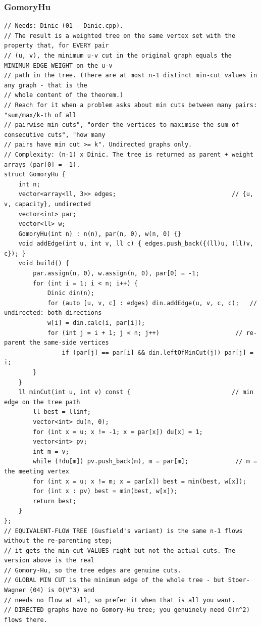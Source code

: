 \documentclass[9pt,a4paper,twocolumn]{extarticle}
\begin{document}
\subsubsection{GomoryHu}
\nopagebreak
\begin{lstlisting}
// Needs: Dinic (01 - Dinic.cpp).
// The result is a weighted tree on the same vertex set with the property that, for EVERY pair
// (u, v), the minimum u-v cut in the original graph equals the MINIMUM EDGE WEIGHT on the u-v
// path in the tree. (There are at most n-1 distinct min-cut values in any graph - that is the
// whole content of the theorem.)
// Reach for it when a problem asks about min cuts between many pairs: "sum/max/k-th of all
// pairwise min cuts", "order the vertices to maximise the sum of consecutive cuts", "how many
// pairs have min cut >= k". Undirected graphs only.
// Complexity: (n-1) x Dinic. The tree is returned as parent + weight arrays (par[0] = -1).
struct GomoryHu {
    int n;
    vector<array<ll, 3>> edges;                                // {u, v, capacity}, undirected
    vector<int> par;
    vector<ll> w;
    GomoryHu(int n) : n(n), par(n, 0), w(n, 0) {}
    void addEdge(int u, int v, ll c) { edges.push_back({(ll)u, (ll)v, c}); }
    void build() {
        par.assign(n, 0), w.assign(n, 0), par[0] = -1;
        for (int i = 1; i < n; i++) {
            Dinic din(n);
            for (auto [u, v, c] : edges) din.addEdge(u, v, c, c);   // undirected: both directions
            w[i] = din.calc(i, par[i]);
            for (int j = i + 1; j < n; j++)                     // re-parent the same-side vertices
                if (par[j] == par[i] && din.leftOfMinCut(j)) par[j] = i;
        }
    }
    ll minCut(int u, int v) const {                            // min edge on the tree path
        ll best = llinf;
        vector<int> du(n, 0);
        for (int x = u; x != -1; x = par[x]) du[x] = 1;
        vector<int> pv;
        int m = v;
        while (!du[m]) pv.push_back(m), m = par[m];             // m = the meeting vertex
        for (int x = u; x != m; x = par[x]) best = min(best, w[x]);
        for (int x : pv) best = min(best, w[x]);
        return best;
    }
};
// EQUIVALENT-FLOW TREE (Gusfield's variant) is the same n-1 flows without the re-parenting step;
// it gets the min-cut VALUES right but not the actual cuts. The version above is the real
// Gomory-Hu, so the tree edges are genuine cuts.
// GLOBAL MIN CUT is the minimum edge of the whole tree - but Stoer-Wagner (04) is O(V^3) and
// needs no flow at all, so prefer it when that is all you want.
// DIRECTED graphs have no Gomory-Hu tree; you genuinely need O(n^2) flows there.
\end{lstlisting}
\end{document}
